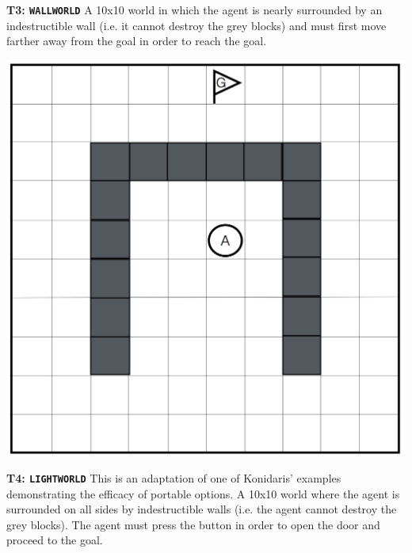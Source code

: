 \documentclass[]{article}
\begin{document}
{\bf T3: \texttt{WALLWORLD}}
A 10x10 world in which the agent is nearly surrounded by an indestructible wall (i.e. it cannot destroy the grey blocks) and must first move farther away from the goal in order to reach the goal.

\begin{center}
\includegraphics[scale=0.21]{figures/uwall.png}
\end{center}


{\bf T4: \texttt{LIGHTWORLD}} This is an adaptation of one of Konidaris' examples demonstrating the efficacy of portable options. A 10x10 world where the agent is surrounded on all sides by indestructible walls (i.e. the agent cannot destroy the grey blocks). The agent must press the button in order to open the door and proceed to the goal.
\end{document}
